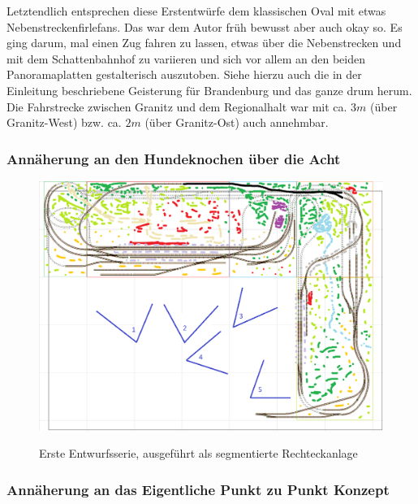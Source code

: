 Letztendlich entsprechen diese Erstentw\"urfe dem klassischen Oval mit etwas Nebenstreckenfirlefans.
Das war dem Autor fr\"uh bewusst aber auch okay so.
Es ging darum, mal einen Zug fahren zu lassen, etwas \"uber die Nebenstrecken und mit dem Schattenbahnhof zu variieren und sich vor allem an den beiden Panoramaplatten gestalterisch auszutoben.
Siehe hierzu auch die in der Einleitung beschriebene Geisterung f\"ur Brandenburg und das ganze drum herum.
Die Fahrstrecke zwischen Granitz und dem Regionalhalt war mit ca. $3m$ (\"uber Granitz-West) bzw. ca. $2m$ (\"uber Granitz-Ost) auch annehmbar.


\subsubsection{Ann\"aherung an den Hundeknochen \"uber die Acht}



\begin{figure}[h]
\centering
  \includegraphics[width=1.0\textwidth]{img/map_evolution/state2_granitz_modules_details.png}
	\label{img:state2_granitz_modules_details}
	\caption{Erste Entwurfsserie, ausgef\"uhrt als segmentierte Rechteckanlage}
\end{figure}





\subsubsection{Ann\"aherung an das Eigentliche Punkt zu Punkt Konzept}


